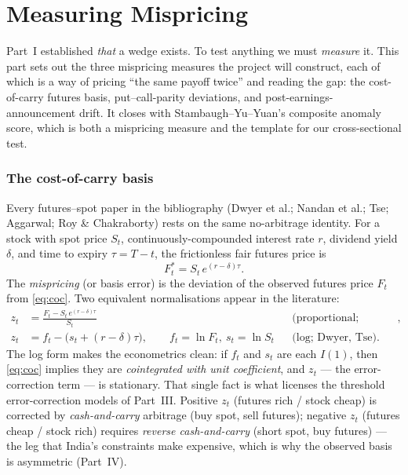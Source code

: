 \part{Measuring Mispricing}
\label{part:measurement}

Part~I established \emph{that} a wedge exists. To test anything we must \emph{measure} it. This part sets out the three mispricing measures the project will construct, each of which is a way of pricing ``the same payoff twice'' and reading the gap: the cost-of-carry futures basis, put--call-parity deviations, and post-earnings-announcement drift. It closes with Stambaugh--Yu--Yuan's composite anomaly score, which is both a mispricing measure and the template for our cross-sectional test.

\section{The cost-of-carry basis}
\label{sec:basis}
Every futures--spot paper in the bibliography (Dwyer et al.; Nandan et al.; Tse; Aggarwal; Roy \& Chakraborty) rests on the same no-arbitrage identity. For a stock with spot price $S_t$, continuously-compounded interest rate $r$, dividend yield $\delta$, and time to expiry $\tau=T-t$, the frictionless fair futures price is
\begin{equation}
F_t^{\ast} = S_t\, e^{(r-\delta)\tau}. \label{eq:coc}
\end{equation}
The \emph{mispricing} (or basis error) is the deviation of the observed futures price $F_t$ from \eqref{eq:coc}. Two equivalent normalisations appear in the literature:
\begin{align}
z_t &= \frac{F_t - S_t\,e^{(r-\delta)\tau}}{S_t} && \text{(proportional; Aggarwal)}, \label{eq:basis-prop}\\
z_t &= f_t - \big(s_t + (r-\delta)\tau\big),\qquad f_t=\ln F_t,\ s_t=\ln S_t && \text{(log; Dwyer, Tse)}. \label{eq:basis-log}
\end{align}
The log form makes the econometrics clean: if $f_t$ and $s_t$ are each $I(1)$, then \eqref{eq:coc} implies they are \emph{cointegrated with unit coefficient}, and $z_t$ --- the error-correction term --- is stationary. That single fact is what licenses the threshold error-correction models of Part~III. Positive $z_t$ (futures rich / stock cheap) is corrected by \emph{cash-and-carry} arbitrage (buy spot, sell futures); negative $z_t$ (futures cheap / stock rich) requires \emph{reverse cash-and-carry} (short spot, buy futures) --- the leg that India's constraints make expensive, which is why the observed basis is asymmetric (Part~IV).

